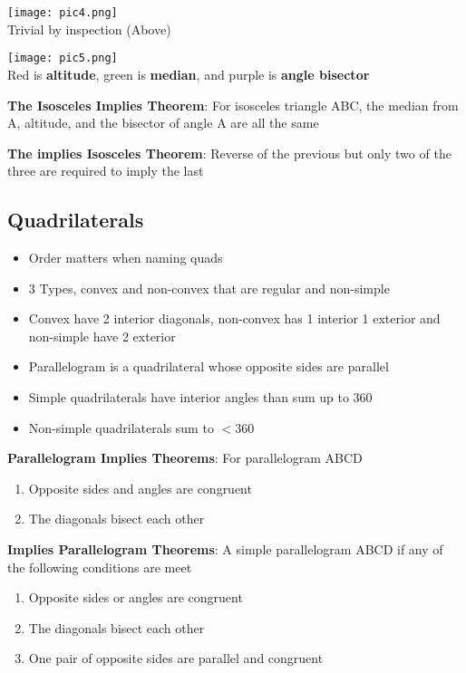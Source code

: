 \documentclass[11pt]{article}
\begin{document}
\noindent\texttt{[image: pic4.png]}\\
\noindent Trivial by inspection (Above)


\noindent\texttt{[image: pic5.png]}\\
\noindent Red is \textbf{altitude}, green is \textbf{median}, and purple is \textbf{angle bisector}

\noindent\textbf{The Isosceles Implies Theorem}: For isosceles triangle ABC, the median from A, altitude, and the bisector of angle A are all the same

\noindent\textbf{The implies Isosceles Theorem}: Reverse of the previous but only two of the three are required to imply the last

\subsection{Quadrilaterals}
\begin{itemize}
  \item Order matters when naming quads
  \item 3 Types, convex and non-convex that are regular and non-simple
  \item Convex have 2 interior diagonals, non-convex has 1 interior 1 exterior and non-simple have 2 exterior
  \item Parallelogram is a quadrilateral whose opposite sides are parallel
  \item Simple quadrilaterals have interior angles than sum up to 360
  \item Non-simple quadrilaterals sum to $< 360$
\end{itemize}

\noindent \textbf{Parallelogram Implies Theorems}: For parallelogram ABCD
\begin{enumerate}
    \item Opposite sides and angles are congruent
    \item The diagonals bisect each other 
\end{enumerate}

\noindent \textbf{Implies Parallelogram Theorems}: A simple parallelogram ABCD if any of the following conditions are meet
\begin{enumerate}
    \item Opposite sides or angles are congruent
    \item The diagonals bisect each other 
    \item One pair of opposite sides are parallel and congruent
\end{enumerate}
\end{document}
